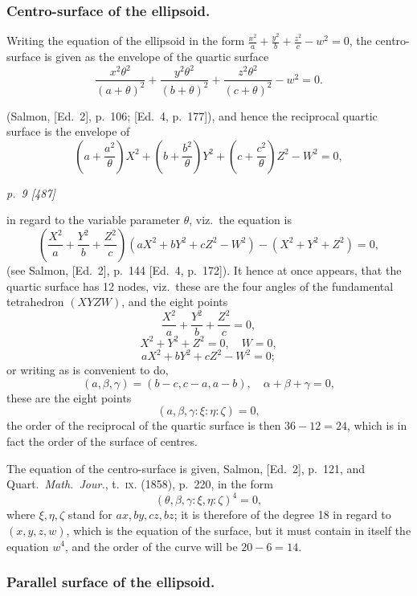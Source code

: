 \documentclass[11pt,a4paper]{article}
\theoremstyle{plain}
\theoremstyle{definition}
\begin{document}
\subsubsection*{Centro-surface of the ellipsoid.}

Writing the equation of the ellipsoid in the form $\frac{x^2}{a} + \frac{y^2}{b} + \frac{z^2}{c} - w^2 = 0$, the centro-surface is given as the envelope of the quartic surface
\[
\frac{x^2 \theta^2}{(a + \theta)^2} + \frac{y^2 \theta^2}{(b + \theta)^2} + \frac{z^2 \theta^2}{(c + \theta)^2} - w^2 = 0.
\]

(Salmon, [Ed.\ 2], p.~106; [Ed.\ 4, p.~177]), and hence the reciprocal quartic surface is the
envelope of
\[
\left(a + \frac{a^2}{\theta}\right)X^2 + \left(b + \frac{b^2}{\theta}\right)Y^2 + \left(c + \frac{c^2}{\theta}\right)Z^2 - W^2 = 0,
\]

\clearpage

\bigskip
\textit{p.~9 [487]}
\smallskip

in regard to the variable parameter $\theta$, viz.\ the equation is
\[
\left(\frac{X^2}{a} + \frac{Y^2}{b} + \frac{Z^2}{c}\right)(aX^2 + bY^2 + cZ^2 - W^2) - (X^2 + Y^2 + Z^2) = 0,
\]
(see Salmon, [Ed.\ 2], p.~144 [Ed.\ 4, p.~172]).  It hence at once appears, that the quartic
surface has 12 nodes, viz.\ these are the four angles of the fundamental tetrahedron
$(XYZW)$, and the eight points
\[
\frac{X^2}{a} + \frac{Y^2}{b} + \frac{Z^2}{c} = 0,
\]
\[
X^2 + Y^2 + Z^2 = 0, \quad W = 0,
\]
\[
aX^2 + bY^2 + cZ^2 - W^2 = 0;
\]
or writing as is convenient to do,
\[
(a, \beta, \gamma) = (b - c, c - a, a - b), \quad \alpha + \beta + \gamma = 0,
\]
these are the eight points
\[
(a, \beta, \gamma : \xi : \eta : \zeta) = 0,
\]
the order of the reciprocal of the quartic surface is then $36 - 12 = 24$, which is in
fact the order of the surface of centres.

The equation of the centro-surface is given, Salmon, [Ed.\ 2], p.~121, and Quart.\
\textit{Math.\ Jour.}, t.~\textsc{ix.} (1858), p.~220, in the form
\[
(\theta, \beta, \gamma : \xi, \eta : \zeta)^4 = 0,
\]
where $\xi, \eta, \zeta$ stand for $ax, by, cz, bz$; it is therefore of the degree 18 in regard to $(x, y, z, w)$, which is the equation of the surface, but it must contain in itself the equation $w^4$, and the order of the curve will be $20 - 6 = 14$.

\subsubsection*{Parallel surface of the ellipsoid.}
\end{document}
